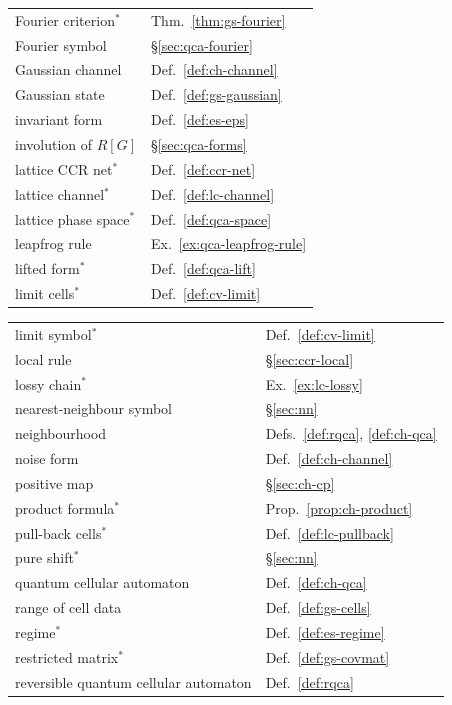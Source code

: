{\begin{minipage}[t]{0.49\textwidth}
\begin{tabular}[t]{@{}>{\raggedright\arraybackslash}p{}@{\quad}l@{}}
Fourier criterion$^*$ & Thm.~\ref{thm:gs-fourier}\\
Fourier symbol & \S\ref{sec:qca-fourier}\\
Gaussian channel & Def.~\ref{def:ch-channel}\\
Gaussian state & Def.~\ref{def:gs-gaussian}\\
invariant form & Def.~\ref{def:es-eps}\\
involution of $R[G]$ & \S\ref{sec:qca-forms}\\
lattice CCR net$^*$ & Def.~\ref{def:ccr-net}\\
lattice channel$^*$ & Def.~\ref{def:lc-channel}\\
lattice phase space$^*$ & Def.~\ref{def:qca-space}\\
leapfrog rule & Ex.~\ref{ex:qca-leapfrog-rule}\\
lifted form$^*$ & Def.~\ref{def:qca-lift}\\
limit cells$^*$ & Def.~\ref{def:cv-limit}\\
\end{tabular}
\end{minipage}\hfill
\begin{minipage}[t]{0.49\textwidth}
\begin{tabular}[t]{@{}>{\raggedright\arraybackslash}p{}@{\quad}l@{}}
limit symbol$^*$ & Def.~\ref{def:cv-limit}\\
local rule & \S\ref{sec:ccr-local}\\
lossy chain$^*$ & Ex.~\ref{ex:lc-lossy}\\
nearest-neighbour symbol & \S\ref{sec:nn}\\
neighbourhood & Defs.~\ref{def:rqca}, \ref{def:ch-qca}\\
noise form & Def.~\ref{def:ch-channel}\\
positive map & \S\ref{sec:ch-cp}\\
product formula$^*$ & Prop.~\ref{prop:ch-product}\\
pull-back cells$^*$ & Def.~\ref{def:lc-pullback}\\
pure shift$^*$ & \S\ref{sec:nn}\\
quantum cellular automaton & Def.~\ref{def:ch-qca}\\
range of cell data & Def.~\ref{def:gs-cells}\\
regime$^*$ & Def.~\ref{def:es-regime}\\
restricted matrix$^*$ & Def.~\ref{def:gs-covmat}\\
reversible quantum cellular automaton & Def.~\ref{def:rqca}\\

\end{tabular}
\end{minipage}}

